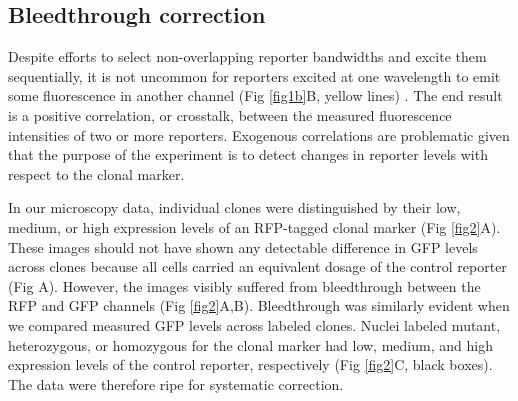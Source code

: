\documentclass[10pt,letterpaper]{article}
\begin{document}
\subsection*{Bleedthrough correction}
\label{ch:correction}

Despite efforts to select non-overlapping reporter bandwidths and excite them sequentially, it is not uncommon for reporters excited at one wavelength to emit some fluorescence in another channel (Fig \ref{fig1b}B, yellow lines) \cite{Bacia2012,Zinchuk2007}. The end result is a positive correlation, or crosstalk, between the measured fluorescence intensities of two or more reporters. Exogenous correlations are problematic given that the purpose of the experiment is to detect changes in reporter levels with respect to the clonal marker.

In our microscopy data, individual clones were distinguished by their low, medium, or high expression levels of an RFP-tagged clonal marker (Fig \ref{fig2}A). These images should not have shown any detectable difference in GFP levels across clones because all cells carried an equivalent dosage of the control reporter (Fig A). However, the images visibly suffered from bleedthrough between the RFP and GFP channels (Fig \ref{fig2}A,B). Bleedthrough was similarly evident when we compared measured GFP levels across labeled clones. Nuclei labeled mutant, heterozygous, or homozygous for the clonal marker had low, medium, and high expression levels of the control reporter, respectively (Fig \ref{fig2}C, black boxes). The data were therefore ripe for systematic correction.
\end{document}
